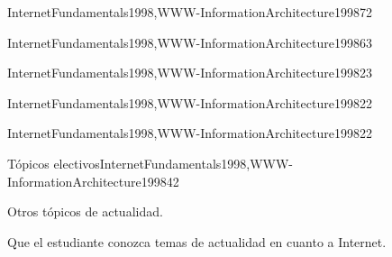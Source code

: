\begin{syllabus}
\begin{unit}{\PBDWebPlatforms}{}{InternetFundamentals1998,WWW-InformationArchitecture1998}{7}{2}
   \PBDWebPlatformsAllTopics
   \PBDWebPlatformsAllLearningOutcomes
\end{unit}

\begin{unit}{\NCNetworkedApplications}{}{InternetFundamentals1998,WWW-InformationArchitecture1998}{6}{3}
   \NCNetworkedApplicationsAllTopics
   \NCNetworkedApplicationsAllLearningOutcomes
\end{unit}

\begin{unit}{\PLObjectOrientedProgramming}{}{InternetFundamentals1998,WWW-InformationArchitecture1998}{2}{3}
   \PLObjectOrientedProgrammingAllTopics
   \PLObjectOrientedProgrammingAllLearningOutcome
\end{unit}

\begin{unit}{\IMMultimediaSystems}{}{InternetFundamentals1998,WWW-InformationArchitecture1998}{2}{2}
   \IMMultimediaSystemsAllTopics
   \IMMultimediaSystemsAllLearningOutcomes
\end{unit}

\begin{unit}{\SESoftwareProjectManagement}{}{InternetFundamentals1998,WWW-InformationArchitecture1998}{2}{2}
   \SESoftwareProjectManagementAllTopics
   \SESoftwareProjectManagementAllLearningOutcomes
\end{unit}

\begin{unit}{Tópicos electivos}{}{InternetFundamentals1998,WWW-InformationArchitecture1998}{4}{2}
\begin{topics}
      \item Otros tópicos de actualidad.
   \end{topics}
   \begin{learningoutcomes}
      \item Que el estudiante conozca temas de actualidad en cuanto a Internet.
   \end{learningoutcomes}
\end{unit}

\begin{coursebibliography}
\end{coursebibliography}

\end{syllabus}

%

